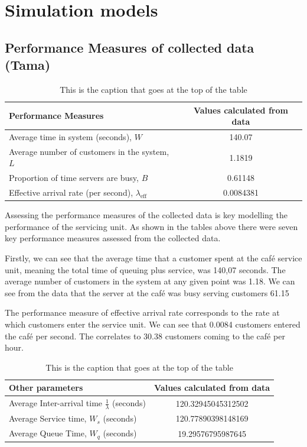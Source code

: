 \documentclass{article}
\begin{document}
\section{Simulation models}

\subsection{Performance Measures of collected data (Tama)}

\begin{table}[H]
    \centering
    \caption{This is the caption that goes at the top of the table}
    \begin{tabu}{X S}
        \toprule
        \textbf{Performance Measures} & \textbf{Values calculated from data}\\
        \midrule
        Average time in system (seconds), $W$   & 140.07 \\
        Average number of customers in the system, $L$ & 1.1819\\
        Proportion of time servers are busy, $B$ & 0.61148  \\
        Effective arrival rate (per second), $\lambda_{\text{eff}}$ & 0.0084381\\
        \bottomrule
    \end{tabu}
    \label{tab:Original Data PF}
\end{table}

Assessing the performance measures of the collected data is key modelling the performance of the servicing unit. As shown in the tables above there were seven key performance measures assessed from the collected data. 

Firstly, we can see that the average time that a customer spent at the café service unit, meaning the total time of queuing plus service, was 140,07 seconds. The average number of customers in the system at any given point was 1.18. We can see from the data that the server at the café was busy serving customers 61.15%

The performance measure of effective arrival rate corresponds to the rate at which customers enter the service unit. We can see that 0.0084 customers entered the café per second. The correlates to 30.38 customers coming to the café per hour.

\begin{table}[H]
    \centering
    \caption{This is the caption that goes at the top of the table}
    \begin{tabu}{X S}
        \toprule
        \textbf{Other parameters} & \textbf{Values calculated from data} \\
        \midrule
        Average Inter-arrival time $\frac{1}{\lambda}$ (seconds) & 120.32945045312502  \\
        Average Service time, $W_s$ (seconds) & 120.77890398148169  \\
        Average Queue Time, $W_q$ (seconds) & 19.29576795987645  \\
        \bottomrule
    \end{tabu}
    \label{tab:Original Data Other}
\end{table}
\end{document}
